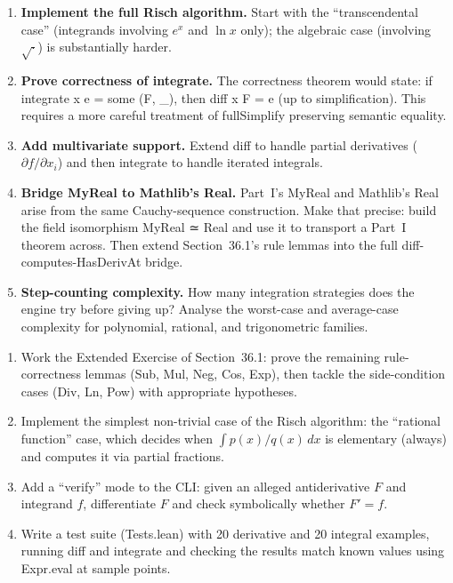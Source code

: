 \documentclass[12pt, openany]{book}
\theoremstyle{plain}
\theoremstyle{definition}
\theoremstyle{remark}
\newcommand{\li}[1]{{\ttfamily\small\color{tealaccent}#1}}
\begin{document}
\begin{enumerate}
  \item \textbf{Implement the full Risch algorithm.}  Start with the
        ``transcendental case'' (integrands involving $e^x$ and $\ln x$ only);
        the algebraic case (involving $\sqrt{\cdot}$) is substantially harder.

  \item \textbf{Prove correctness of \li{integrate}.}  The correctness theorem
        would state: if \li{integrate x e = some (F, \_)}, then
        \li{diff x F = e} (up to simplification).  This requires a more careful
        treatment of \li{fullSimplify} preserving semantic equality.

  \item \textbf{Add multivariate support.}  Extend \li{diff} to handle
        partial derivatives ($\partial f/\partial x_i$) and then
        \li{integrate} to handle iterated integrals.

  \item \textbf{Bridge \li{MyReal} to Mathlib's \li{Real}.}  Part~I's
        \li{MyReal} and Mathlib's \li{Real} arise from the same Cauchy-sequence
        construction.  Make that precise: build the field isomorphism
        \li{MyReal ≃ Real} and use it to transport a Part~I theorem across.
        Then extend Section~36.1's rule lemmas into the full
        \li{diff}-computes-\li{HasDerivAt} bridge.

  \item \textbf{Step-counting complexity.}  How many integration strategies
        does the engine try before giving up?  Analyse the worst-case and
        average-case complexity for polynomial, rational, and trigonometric
        families.
\end{enumerate}

\begin{exbox}
\begin{enumerate}
  \item Work the Extended Exercise of Section~36.1: prove the remaining
        rule-correctness lemmas (\li{Sub}, \li{Mul}, \li{Neg}, \li{Cos},
        \li{Exp}), then tackle the side-condition cases (\li{Div}, \li{Ln},
        \li{Pow}) with appropriate hypotheses.
  \item Implement the simplest non-trivial case of the Risch algorithm: the
        ``rational function'' case, which decides when $\int p(x)/q(x)\,dx$ is
        elementary (always) and computes it via partial fractions.
  \item Add a ``verify'' mode to the CLI: given an alleged antiderivative $F$
        and integrand $f$, differentiate $F$ and check symbolically whether
        $F'=f$.
  \item Write a test suite (\li{Tests.lean}) with 20 derivative and 20 integral
        examples, running \li{diff} and \li{integrate} and checking the results
        match known values using \li{Expr.eval} at sample points.
\end{enumerate}
\end{exbox}
\color{black}
\end{document}
